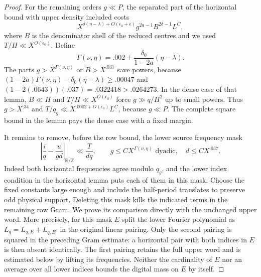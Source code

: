 \documentclass[11pt,a4paper]{article}
\theoremstyle{paperplain}
\numberwithin{equation}{section}
\begin{document}
\begin{proof}
For the remaining orders $g\ll P$, the separated part
of the horizontal bound with upper density included costs
\[
 X^{\delta(\eta-\lambda)+O(\epsilon_0+\epsilon)}
                   g^{2a-1} B^{2\delta-1}L^C,
\]
where $B$ is the denominator shell of the reduced centres
and we used $T/H\ll X^{O(\epsilon_0)}$. Define
\begin{equation}\label{eq:near-balanced-order-cutoff}
     \Gamma(\nu,\eta)=.002+\frac{\delta_0}{1-2a}(\eta-\lambda).
\end{equation}
The parts $g>X^{\Gamma(\nu,\eta)}$ or $B>X^{.037}$ save
powers, because
$(1-2a)\Gamma(\nu,\eta)-\delta_0(\eta-\lambda)\ge.00047$ and
$(1-2(.0643))(.037)=.0322418>.0264273$.
In the dense case of that lemma, $B\ll H$ and $T/H\ll
X^{O(\epsilon_0)}$ force $g\gg q/H^2$ up to small powers.
Thus $g>X^{.34}$ and $T/q_g\ll X^{.0002+O(\epsilon_0)}L^C$,
because $g\ll P$. The complete square bound in the lemma
pays the dense case with a fixed margin.

It remains to remove, before the row bound, the lower source
frequency mask
\begin{equation}\label{eq:near-balanced-lower-band}
 \left|\frac{i}{q}-\frac{u}{gd}\right|_{\mathbb R/\mathbb Z}
        \ll \frac{T}{dq},\qquad
               g\le C X^{\Gamma(\nu,\eta)}\text{ dyadic},\quad
               d\le C X^{.037}.
\end{equation}
Indeed both horizontal frequencies agree modulo $q_g$, and
the lower index condition in the horizontal lemma puts each
of them in this mask. Choose the fixed constants large
enough and include the half-period translates to preserve
odd physical support. Deleting this mask kills the indicated
terms in the remaining row Gram. We prove its comparison
directly with the unchanged upper word. More precisely, for this
mask $E$ split the lower Fourier polynomial as $L_q=L_{q,E}+L_{q,E^c}$
in the original linear pairing. Only the second pairing is squared
in the preceding Gram estimate: a horizontal pair with both indices
in $E$ is then absent identically. The first pairing retains the full
upper word and is estimated below by lifting its frequencies. Neither
the cardinality of $E$ nor an average over all lower indices bounds
the digital mass on $E$ by itself.


\end{proof}
\end{document}
